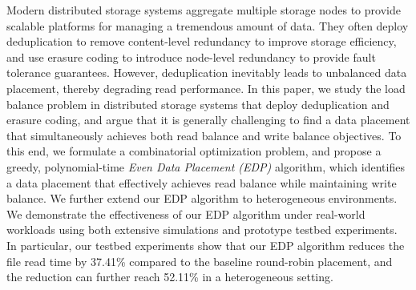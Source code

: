 Modern distributed storage systems aggregate multiple storage nodes to provide
scalable platforms for managing a tremendous amount of data.  They often
deploy deduplication to remove content-level redundancy to improve storage
efficiency, and use erasure coding to introduce node-level redundancy to
provide fault tolerance guarantees.  However, deduplication inevitably leads
to unbalanced data placement, thereby degrading read performance.  In this
paper, we study the load balance problem in distributed storage systems that
deploy deduplication and erasure coding, and argue that it is generally
challenging to find a data placement that simultaneously achieves both read
balance and write balance objectives.  To this end, we formulate a
combinatorial optimization problem, and propose a greedy, polynomial-time
{\em Even Data Placement (EDP)} algorithm, which identifies a data placement
that effectively achieves read balance while maintaining write balance.  We
further extend our EDP algorithm to heterogeneous environments.  We
demonstrate the effectiveness of our EDP algorithm under real-world workloads
using both extensive simulations and prototype testbed experiments.  In
particular, our testbed experiments show that our EDP algorithm reduces the
file read time by 37.41\% compared to the baseline round-robin placement, and
the reduction can further reach 52.11\% in a heterogeneous setting.
